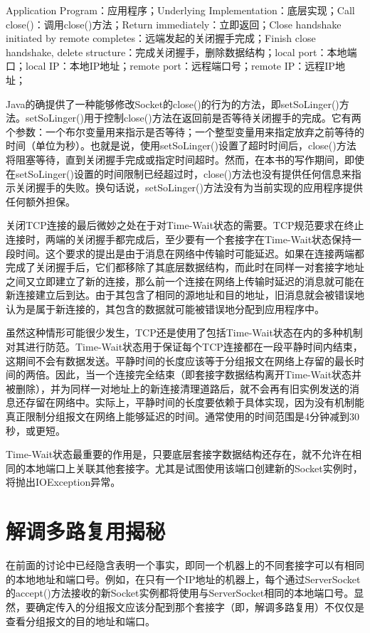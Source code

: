 		Application Program：应用程序；Underlying Implementation：底层实现；Call close()：调用close()方法；Return immediately：立即返回；Close handshake initiated by remote completes：远端发起的关闭握手完成；Finish close handshake, delete structure：完成关闭握手，删除数据结构；local port：本地端口；local IP：本地IP地址；remote port：远程端口号；remote IP：远程IP地址；

		Java的确提供了一种能够修改Socket的close()的行为的方法，即setSoLinger()方法。setSoLinger()用于控制close()方法在返回前是否等待关闭握手的完成。它有两个参数：一个布尔变量用来指示是否等待；一个整型变量用来指定放弃之前等待的时间（单位为秒）。也就是说，使用setSoLinger()设置了超时时间后，close()方法将阻塞等待，直到关闭握手完成或指定时间超时。然而，在本书的写作期间，即使在setSoLinger()设置的时间限制已经超过时，close()方法也没有提供任何信息来指示关闭握手的失败。换句话说，setSoLinger()方法没有为当前实现的应用程序提供任何额外担保。

		关闭TCP连接的最后微妙之处在于对Time-Wait状态的需要。TCP规范要求在终止连接时，两端的关闭握手都完成后，至少要有一个套接字在Time-Wait状态保持一段时间。这个要求的提出是由于消息在网络中传输时可能延迟。如果在连接两端都完成了关闭握手后，它们都移除了其底层数据结构，而此时在同样一对套接字地址之间又立即建立了新的连接，那么前一个连接在网络上传输时延迟的消息就可能在新连接建立后到达。由于其包含了相同的源地址和目的地址，旧消息就会被错误地认为是属于新连接的，其包含的数据就可能被错误地分配到应用程序中。

		虽然这种情形可能很少发生，TCP还是使用了包括Time-Wait状态在内的多种机制对其进行防范。Time-Wait状态用于保证每个TCP连接都在一段平静时间内结束，这期间不会有数据发送。平静时间的长度应该等于分组报文在网络上存留的最长时间的两倍。因此，当一个连接完全结束（即套接字数据结构离开Time-Wait状态并被删除），并为同样一对地址上的新连接清理道路后，就不会再有旧实例发送的消息还存留在网络中。实际上，平静时间的长度要依赖于具体实现，因为没有机制能真正限制分组报文在网络上能够延迟的时间。通常使用的时间范围是4分钟减到30秒，或更短。

		Time-Wait状态最重要的作用是，只要底层套接字数据结构还存在，就不允许在相同的本地端口上关联其他套接字。尤其是试图使用该端口创建新的Socket实例时，将抛出IOException异常。

\section{解调多路复用揭秘}

	在前面的讨论中已经隐含表明一个事实，即同一个机器上的不同套接字可以有相同的本地地址和端口号。例如，在只有一个IP地址的机器上，每个通过ServerSocket的accept()方法接收的新Socket实例都将使用与ServerSocket相同的本地端口号。显然，要确定传入的分组报文应该分配到那个套接字（即，解调多路复用）不仅仅是查看分组报文的目的地址和端口。



